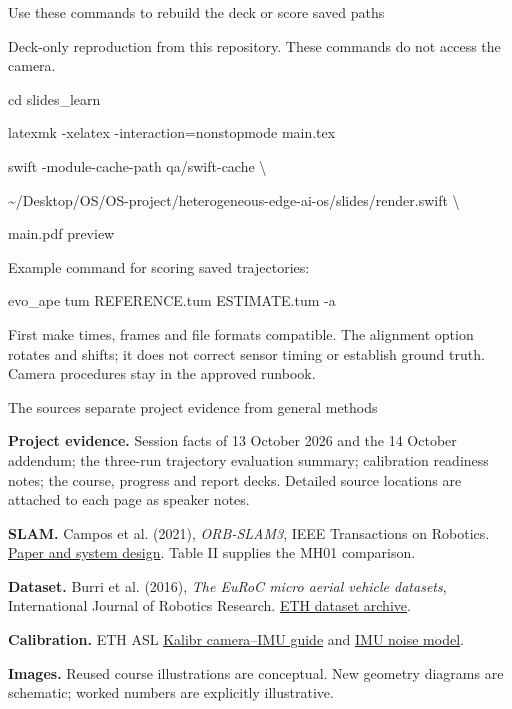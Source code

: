 \documentclass[aspectratio=169,12pt,t]{beamer}
\newcommand{\para}[1]{#1\par\medskip}
\begin{document}
\begin{frame}{Use these commands to rebuild the deck or score saved paths}

\para{Deck-only reproduction from this repository. These commands do not access the camera.}
{\small\ttfamily
cd slides\_learn\par
latexmk -xelatex -interaction=nonstopmode main.tex\par\medskip
swift -module-cache-path qa/swift-cache \textbackslash{}\par
\quad \textasciitilde/Desktop/OS/OS-project/heterogeneous-edge-ai-os/slides/render.swift \textbackslash{}\par
\quad main.pdf preview\par}
\medskip\para{Example command for scoring saved trajectories:}
{\small\ttfamily evo\_ape tum REFERENCE.tum ESTIMATE.tum -a\par}
\medskip\para{First make times, frames and file formats compatible. The alignment option rotates and shifts; it does not correct sensor timing or establish ground truth. Camera procedures stay in the approved runbook.}

\end{frame}

\begin{frame}{The sources separate project evidence from general methods}

{\small
\para{\textbf{Project evidence.} Session facts of 13 October 2026 and the 14 October addendum; the three-run trajectory evaluation summary; calibration readiness notes; the course, progress and report decks. Detailed source locations are attached to each page as speaker notes.}
\para{\textbf{SLAM.} Campos et al. (2021), \emph{ORB-SLAM3}, IEEE Transactions on Robotics. \href{https://arxiv.org/abs/2007.11898}{Paper and system design}. Table II supplies the MH01 comparison.}
\para{\textbf{Dataset.} Burri et al. (2016), \emph{The EuRoC micro aerial vehicle datasets}, International Journal of Robotics Research. \href{https://ethz-asl.github.io/datasets/}{ETH dataset archive}.}
\para{\textbf{Calibration.} ETH ASL \href{https://github.com/ethz-asl/kalibr/wiki/camera-imu-calibration}{Kalibr camera--IMU guide} and \href{https://github.com/ethz-asl/kalibr/wiki/IMU-Noise-Model}{IMU noise model}.}
\para{\textbf{Images.} Reused course illustrations are conceptual. New geometry diagrams are schematic; worked numbers are explicitly illustrative.}
}

\end{frame}
\end{document}
